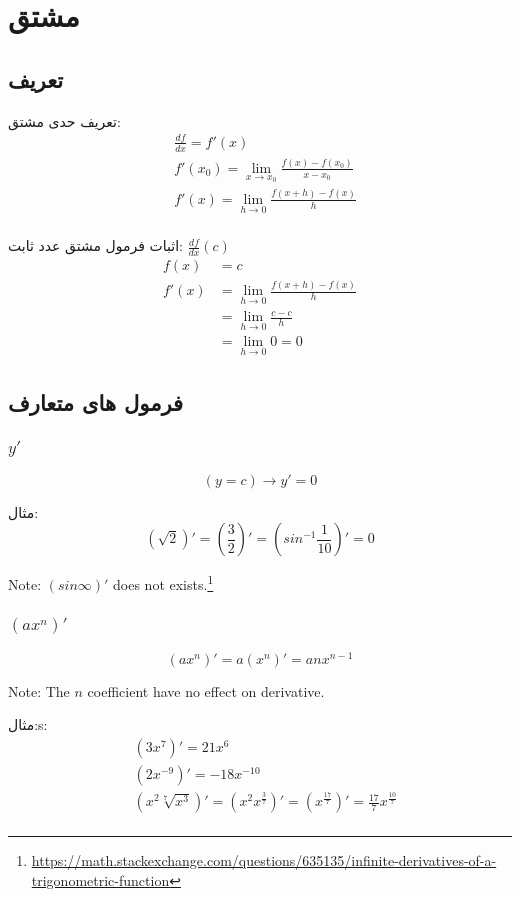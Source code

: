 \section{مشتق}
\subsection{تعریف}
تعریف حدی مشتق:
\begin{align*}
&\frac{df}{dx} = f'(x) \\
&f'(x_0) = \lim_{x\to x_0} \frac{f(x) - f(x_0)}{x-x_0} \\
&f'(x) = \lim_{h\to 0} \frac{f(x+h) - f(x)}{h} \\
\end{align*}

اثبات فرمول مشتق عدد ثابت: $\frac{df}{dx}(c)$
\begin{align*}
f(x) &= c \\
f'(x) &= \lim_{h\to 0}\frac{f(x+h) - f(x)}{h} \\
&= \lim_{h\to 0}\frac{c - c}{h} \\
&= \lim_{h\to 0} 0 = 0
\end{align*}

\subsection{فرمول های متعارف}
\subsubsection{$y'$}
\[ (y = c)\to y'= 0 \]

مثال:
\[ (\sqrt{2})' = (\frac{3}{2})' = (sin^{-1}\frac{1}{10})' = 0 \]

Note: $(sin\infty)'$ does not exists.\footnote{\href{https://math.stackexchange.com/questions/635135/infinite-derivatives-of-a-trigonometric-function}{https://math.stackexchange.com/questions/635135/infinite-derivatives-of-a-trigonometric-function}}

\subsubsection{$(ax^n)'$}
\[ (ax^n)' = a(x^n)' = anx^{n-1} \]

Note: The $n$ coefficient have no effect on derivative.

مثال:s:
\begin{align*}
&(3x^7)' = 21x^6 \\
&(2x^{-9})' = -18x^{-10} \\
&(x^{2}\sqrt[7]{x^3})'=
	(x^2 x^{\frac{3}{7}})' =
	(x^{\frac{17}{7}})' =
	\frac{17}{7} x^{\frac{10}{7}} \\
\end{align*}

